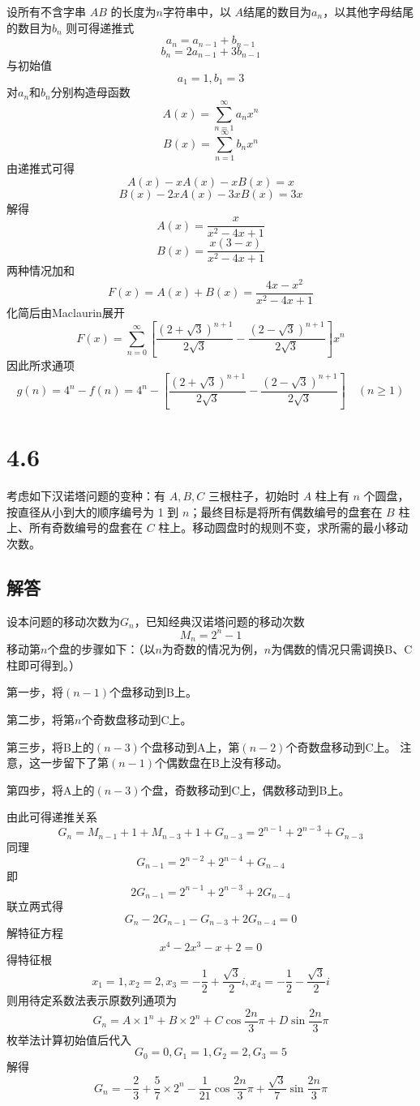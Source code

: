 \documentclass[12pt]{article}
\begin{document}
设所有不含字串 \( AB \) 的长度为\( n \)字符串中，以 \( A \)结尾的数目为\( a_n \)，以其他字母结尾的数目为\( b_n \)
则可得递推式
\[a_n = a_{n-1}+b_{n-1}\]
\[b_n = 2a_{n-1}+3b_{n-1}\]
与初始值
\[a_1=1, b_1=3\]
对\( a_n \)和\( b_n \)分别构造母函数
\[A(x)=\sum_{n=1}^\infty a_nx^n\]
\[B(x)=\sum_{n=1}^\infty b_nx^n\]
由递推式可得
\[A(x)-xA(x)-xB(x)=x\]
\[B(x)-2xA(x)-3xB(x)=3x\]
解得
\[A(x)=\frac{x}{x^2-4x+1}\]
\[B(x)=\frac{x(3-x)}{x^2-4x+1}\]
两种情况加和
\[F(x) = A(x) + B(x) =\frac{4x - x^2}{x^2 - 4x + 1}\]
化简后由Maclaurin展开
\[F(x) = \sum_{n=0}^{\infty} \left[ \frac{(2 + \sqrt{3})^{n+1} }{2\sqrt{3}} - \frac{(2 - \sqrt{3})^{n+1}}{2\sqrt{3}} \right] x^n\]
因此所求通项
\[g(n)=4^n-f(n)=4^n-\left[ \frac{(2 + \sqrt{3})^{n+1} }{2\sqrt{3}} - \frac{(2 - \sqrt{3})^{n+1}}{2\sqrt{3}} \right] \quad (n\geq 1)\]


\section*{4.6}
考虑如下汉诺塔问题的变种：有 \( A, B, C \) 三根柱子，初始时 \( A \) 柱上有 \( n \) 个圆盘，按直径从小到大的顺序编号为 1 到 \( n \)；最终目标是将所有偶数编号的盘套在 \( B \) 柱上、所有奇数编号的盘套在 \( C \) 柱上。移动圆盘时的规则不变，求所需的最小移动次数。
\subsection*{解答}
设本问题的移动次数为\(G_n\)，已知经典汉诺塔问题的移动次数\[M_n = 2^n -1\]
移动第$n$个盘的步骤如下：（以$n$为奇数的情况为例，$n$为偶数的情况只需调换B、C柱即可得到。）

第一步，将$(n-1)$个盘移动到B上。

第二步，将第$n$个奇数盘移动到C上。

第三步，将B上的$(n-3)$个盘移动到A上，第$(n-2)$个奇数盘移动到C上。
注意，这一步留下了第$(n-1)$个偶数盘在B上没有移动。

第四步，将A上的$(n-3)$个盘，奇数移动到C上，偶数移动到B上。

由此可得递推关系
\[G_n=M_{n-1}+1+M_{n-3}+1+G_{n-3}=2^{n-1}+2^{n-3}+G_{n-3}\]
同理
\[G_{n-1}=2^{n-2}+2^{n-4}+G_{n-4}\]
即
\[2G_{n-1}=2^{n-1}+2^{n-3}+2G_{n-4}\]
联立两式得
\[G_n-2G_{n-1}-G_{n-3}+2G_{n-4}=0\]
解特征方程
\[x^4 - 2x^3 - x + 2 = 0\]
得特征根
\[x_1 = 1, x_2 = 2, x_3 = -\frac{1}{2} + \frac{\sqrt{3}}{2}i, x_4 = -\frac{1}{2} - \frac{\sqrt{3}}{2}i\]
则用待定系数法表示原数列通项为
\[
G_n = A\times1^n + B\times2^n + C\cos\frac{2n}{3}\pi + D\sin\frac{2n}{3}\pi
\]
枚举法计算初始值后代入
\[G_0=0, G_1=1, G_2=2, G_3=5\]
解得
\[
G_n = -\frac{2}{3} + \frac{5}{7}\times2^n - \frac{1}{21}\cos\frac{2n}{3}\pi + \frac{\sqrt{3}}{7}\sin\frac{2n}{3}\pi
\]
\end{document}
